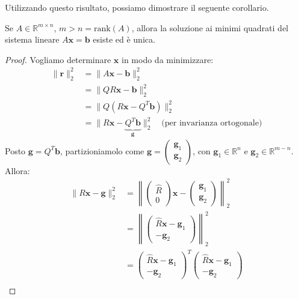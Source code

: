 Utilizzando questo risultato, possiamo dimostrare il seguente corollario.
\begin{corollario}
Se $A \in \mathbb{R}^{m \times n}$, $m > n = \text{rank}(A)$, allora la soluzione ai minimi quadrati del sistema lineare $A\mathbf{x} = \mathbf{b}$ esiste ed è unica.
\end{corollario}
\begin{proof}
    Vogliamo determinare $\mathbf{x}$ in modo da minimizzare:
    \begin{align*}
        \| \mathbf{r} \|_2^2 &= \| A\mathbf{x} - \mathbf{b} \|_2^2 \\
        &= \| Q R \mathbf{x} - \mathbf{b} \|_2^2 \\
        &= \| Q(R\mathbf{x} - Q^T\mathbf{b}) \|_2^2 \\
        &= \| R\mathbf{x} - \underbrace{Q^T\mathbf{b}}_{\mathbf{g}} \|_2^2 \quad \text{(per invarianza ortogonale)}
    \end{align*}
    Posto $\mathbf{g} = Q^T \mathbf{b}$, partizioniamolo come $\mathbf{g} = \begin{pmatrix} \mathbf{g}_1 \\ \mathbf{g}_2 \end{pmatrix}$, con $\mathbf{g}_1 \in \mathbb{R}^n$ e $\mathbf{g}_2 \in \mathbb{R}^{m-n}$.
    Allora:
    \begin{align*}
        \| R\mathbf{x} - \mathbf{g} \|_2^2 &= \left\| \begin{pmatrix} \hat{R} \\ 0 \end{pmatrix} \mathbf{x} - \begin{pmatrix} \mathbf{g}_1 \\ \mathbf{g}_2 \end{pmatrix} \right\|_2^2 \\
        &= \left\| \begin{pmatrix} \hat{R}\mathbf{x} - \mathbf{g}_1 \\ -\mathbf{g}_2 \end{pmatrix} \right\|_2^2 \\
        &= \begin{pmatrix} \hat{R}\mathbf{x} - \mathbf{g}_1 \\ -\mathbf{g}_2 \end{pmatrix}^T \begin{pmatrix} \hat{R}\mathbf{x} - \mathbf{g}_1 \\ -\mathbf{g}_2 \end{pmatrix} \\

\end{align*}
\end{proof}
